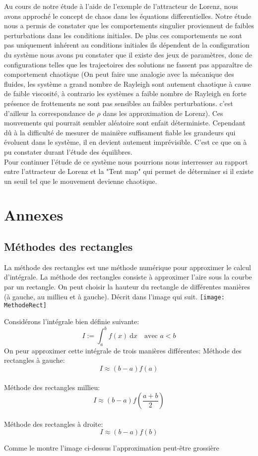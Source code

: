 \documentclass{article}
\newtheorem[M , nocut]{prop}{Proposition}[section]
\newtheorem[S , nocut]{definition}{Définition}
\newtheorem[S , nocut]{lemme}{Lemme}
\newtheorem[L , nocut]{thm}{Théoreme}
\newtheorem[L , nocut]{cor}{Corollaire}
\begin{document}
Au cours de notre étude à l'aide de l'exemple de l'attracteur de Lorenz, nous avons approché le concept de chaos dans les équations differentielles. Notre étude nous a permis de constater que les comportements singulier proviennent de faibles perturbations dans les conditions initiales. De plus ces comportements ne sont pas uniquement inhérent au conditions initiales ils dépendent de la configuration du système nous avons pu constater que il existe des jeux de paramètres, donc de configurations telles que les trajectoires des solutions ne fassent pas apparaître de comportement chaotique (On peut faire une analogie avec la mécanique des fluides, les système a grand nombre de Rayleigh sont autement chaotique à cause de faible viscosité, à contrario les systèmes a faible nombre de Rayleigh en forte présence de frottements ne sont pas sensibles au faibles perturbations. c'est d'ailleur la correspondance de $\rho$ dans les approximation de Lorenz). Ces mouvements qui pourrait sembler aléatoire sont enfait déterministe. Cependant dû à la difficulté de mesurer de mainière suffisament fiable les grandeurs qui évoluent dans le système, il en devient autement imprévisible. C'est ce que on à pu constater durant l'étude des équilibres.\\
Pour continuer l'étude de ce système nous pourrions nous interresser au rapport entre l'attracteur de Lorenz et la "Tent map" qui permet de déterminer si il existe un seuil tel que le mouvement devienne chaotique.

\newpage
\section{Annexes}
\subsection*{Méthodes des rectangles}
La méthode des rectangles est une méthode numérique pour approximer le calcul d'intégrale. La méthode des rectangles consiste à approximer l'aire sous la courbe par un rectangle. On peut choisir la hauteur du rectangle de différentes manières (à gauche, au millieu et à gauche). Décrit dans l'image qui suit.
\texttt{[image: MethodeRect]}

Considérons l'intégrale bien définie suivante:
\[
  I := \int_a^b f(x)\ \mathrm{d}x\quad \text{avec }a<b
\] 
On peur approximer cette intégrale de trois manières différentes:
Méthode des rectangles à gauche:
\[
    I \approx (b-a) f(a)
\]\\
Méthode des rectangles millieu:
\[
    I \approx (b-a) f(\frac{a+b}{2})
\]\\
Méthode des rectangles à droite:
\[
    I \approx (b-a) f(b)
\]
\begin{example}[Remarque]
    Comme le montre l'image ci-dessus l'approximation peut-être grossière
\end{example}
\end{document}
